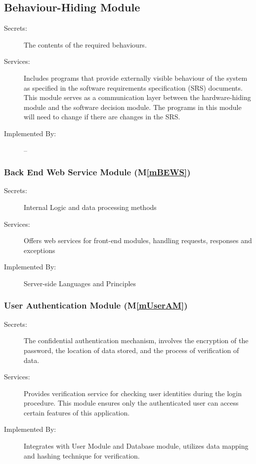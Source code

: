 \documentclass[12pt, titlepage]{article}
\newcommand{\mref}[1]{M\ref{#1}}
\begin{document}
\subsection{Behaviour-Hiding Module}

\begin{description}
\item[Secrets:]The contents of the required behaviours.
\item[Services:]Includes programs that provide externally visible behaviour of
  the system as specified in the software requirements specification (SRS)
  documents. This module serves as a communication layer between the
  hardware-hiding module and the software decision module. The programs in this
  module will need to change if there are changes in the SRS.
\item[Implemented By:] --
\end{description}

\subsubsection{Back End Web Service Module (\mref{mBEWS})}

\begin{description}
\item[Secrets:] Internal Logic and data processing methods
\item[Services:] Offers web services for front-end modules, handling requests, responses and exceptions
\item[Implemented By:] Server-side Languages and Principles
\end{description}


\subsubsection{User Authentication Module (\mref{mUserAM})}

\begin{description}
\item[Secrets:] The confidential authentication mechanism, involves the encryption of the password, the location of data stored, and the process of verification of data.
\item[Services:]  Provides verification service for checking user identities during the login procedure. This module ensures only the authenticated user can access certain features of this application.
\item[Implemented By:] Integrates with User Module and Database module, utilizes data mapping and hashing technique for verification. 
\end{description}
\end{document}
